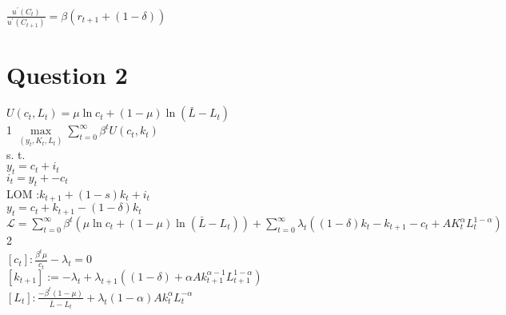 \documentclass[12pt]{article}
\numberwithin{equation}{subsection} %
\begin{document}
$\frac{u^{\prime}(C_{t})}{u^{\prime}(C_{t+1})}=\beta(r_{t+1}+(1-\delta))$










\newpage
\section{Question 2}
\pagestyle{myheadings} \markboth{  } {  }
$U(c_{t},L_{t})=\mu \ln c_{t}+(1-\mu)\ln(\bar{L}-L_{t})$\\

1 $ \underset{(y_{t},K_{t},L_{t})}{\max}  \sum_{t=0}^{\infty}\beta^{t}U(c_{t},k_{t})$\\
s. t.\\
$y_{t}=c_{t}+i_{t}$\\

$i_{t}=y_{t}+-c_{t}$\\

LOM :$k_{t+1}+(1-s)k_{t}+i_{t}$\\

$y_{t}=c_{t}+k_{t+1}-(1-\delta)k_{t}$\\

$\mathcal{L}=\sum_{t=0}^{\infty}\beta^{t}\left(\mu \ln c_{t} +(1-\mu)\ln(\bar{L}-L_{t}) \right)+\sum_{t=0}^{\infty}\lambda_{t}\left((1-\delta)k_{t}-k_{t+1}-c_{t}+AK_{t}^{\alpha}L_{t}^{1-\alpha}\right)$\\

 2\\

$[c_{t}]: \frac{\beta^{t}\mu}{c_{t}}-\lambda_{t}=0$\\


$[k_{t+1}]:=-\lambda_{t}+\lambda_{t+1}\left( (1-\delta)+\alpha Ak_{t+1}^{\alpha-1}L_{t+1}^{1-\alpha}   \right)$\\

$[L_{t}]: \frac{-\beta^{t}(1-\mu)}{\bar{L}-L_{t}}+\lambda_{t}(1-\alpha)Ak_{t}^{\alpha}L_{t}^{-\alpha}$\\
\end{document}
